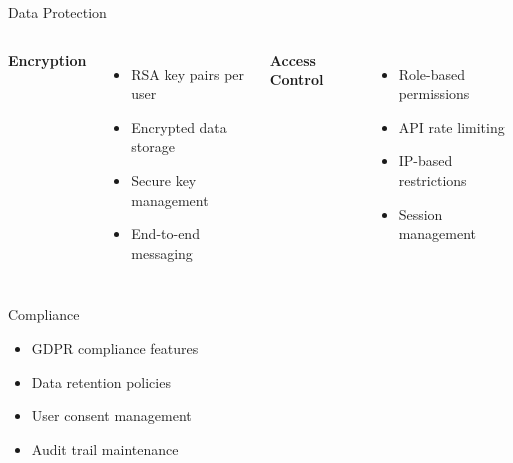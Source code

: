 \documentclass[aspectratio=169]{beamer}
\begin{document}
\begin{frame}{Data Protection}
\begin{columns}
\textbf{Encryption}
\begin{itemize}
    \item RSA key pairs per user
    \item Encrypted data storage
    \item Secure key management
    \item End-to-end messaging
\end{itemize}

\textbf{Access Control}
\begin{itemize}
    \item Role-based permissions
    \item API rate limiting
    \item IP-based restrictions
    \item Session management
\end{itemize}
\end{columns}

\vspace{0.3cm}
\begin{block}{Compliance}
\begin{itemize}
    \item GDPR compliance features
    \item Data retention policies
    \item User consent management
    \item Audit trail maintenance
\end{itemize}
\end{block}
\end{frame}
\end{document}
